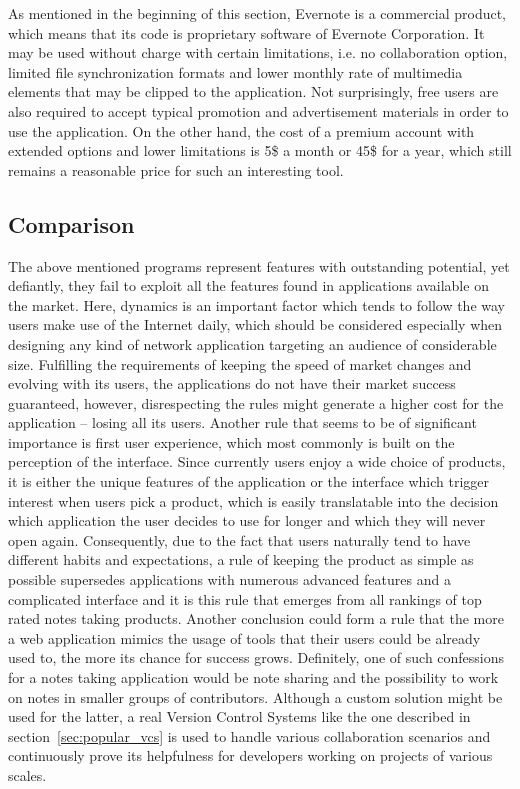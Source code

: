 As mentioned in the beginning of this section, Evernote is a commercial product, which means that its code is proprietary software of Evernote Corporation. It may be used without charge with certain limitations, i.e. no collaboration option, limited file synchronization formats and lower monthly rate of multimedia elements that may be clipped to the application. Not surprisingly, free users are also required to accept typical promotion and advertisement materials in order to use the application. On the other hand, the cost of a premium account with extended options and lower limitations is 5\$ a month or 45\$ for a year, which still remains a reasonable price for such an interesting tool.      
 
\subsection{Comparison}\label{subsec:vcs_comparison}
The above mentioned programs represent features with outstanding potential, yet defiantly, they fail to exploit all the features found in applications available on the market. Here, dynamics is an important factor which tends to follow the way users make use of the Internet daily, which should be considered especially when designing any kind of network application targeting an audience of considerable size. Fulfilling the requirements of keeping the speed of market changes and evolving with its users, the applications do not have their market success guaranteed, however, disrespecting the rules might generate a higher cost for the application -- losing all its users. Another rule that seems to be of significant importance is first user experience, which most commonly is built on the perception of the interface. Since currently users enjoy a wide choice of products, it is either the unique features of the application or the interface which trigger interest when users pick a product, which is easily translatable into the decision which application the user decides to use for longer and which they will never open again. Consequently, due to the fact that users naturally tend to have different habits and expectations, a rule of keeping the product as simple as possible supersedes applications with numerous advanced features and a complicated interface and it is this rule that emerges from all rankings of top rated notes taking products. Another conclusion could form a rule that the more a web application mimics the usage of tools that their users could be already used to, the more its chance for success grows. Definitely, one of such confessions for a notes taking application would be note sharing and the possibility to work on notes in smaller groups of contributors. Although a custom solution might be used for the latter, a real Version Control Systems like the one described in section~\ref{sec:popular_vcs} is used to handle various collaboration scenarios and continuously prove its helpfulness for developers working on projects of various scales. 

